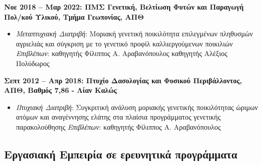 \documentclass[12pt,]{scrartcl}
\begin{document}
\textbf{Νοε 2018 -- Μαρ 2022: ΠΜΣ Γενετική, Βελτίωση Φυτών και Παραγωγή Πολ/κού Υλικού, Τμήμα Γεωπονίας, ΑΠΘ}
\begin{itemize}
\setlength\itemsep{-0.5em}
\item \textit{Μεταπτυχιακή Διατριβή}: Μοριακή γενετική ποικιλότητα επιλεγμένων πληθυσμών αγριελιάς και σύγκριση με το γενετικό προφίλ καλλιεργούμενων ποικιλιών
\vspace{1mm}
\newline
\textit{Επιβλέπων}: καθηγητής Φίλιππος Α. Αραβανόπουλος \newline 
\phantom{1} \hspace{1.58cm} καθηγητής Αλέξιος Πολύδωρος
\end{itemize}

\vspace{2mm}

\textbf{Σεπτ 2012 -- Απρ 2018: Πτυχίο Δασολογίας και Φυσικού Περιβάλλοντος, ΑΠΘ, Βαθμός 7,86 - Λίαν Καλώς}
\begin{itemize}
\setlength\itemsep{-0.5em}
\item \textit{Πτυχιακή Διατριβή}: Συγκριτική ανάλυση μοριακής γενετικής ποικιλότητας
ώριμων ατόμων και αναγέννησης ελάτης στα πλαίσια
προγράμματος γενετικής παρακολούθησης
\vspace{1mm}
\newline
\textit{Επιβλέπων}: καθηγητής Φίλιππος Α. Αραβανόπουλος
\end{itemize}

\vspace{-3mm}

\subsection{Εργασιακή Εμπειρία σε ερευνητικά προγράμματα}\label{Εμπειρία}
\vspace{-3mm}

\end{document}
